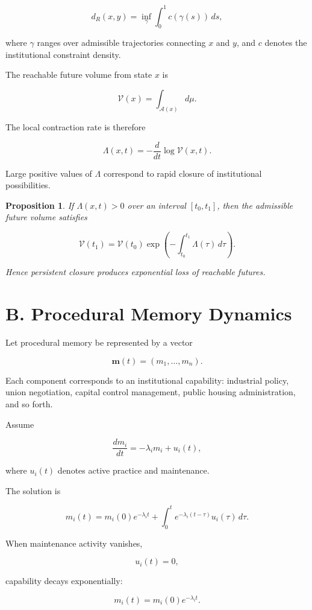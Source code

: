 \documentclass[12pt, a4paper]{article}
\theoremstyle{named}
\newtheorem{proposition}{Proposition}
\begin{document}
\[
d_R(x,y)
=
\inf_{\gamma}
\int_0^1
c(\gamma(s))
\, ds,
\]

where $\gamma$ ranges over admissible trajectories connecting $x$ and
$y$, and $c$ denotes the institutional constraint density.

The reachable future volume from state $x$ is

\[
\mathcal{V}(x)
=
\int_{\mathcal{A}(x)}
d\mu.
\]

The local contraction rate is therefore

\[
\Lambda(x,t)
=
-
\frac{d}{dt}
\log \mathcal{V}(x,t).
\]

Large positive values of $\Lambda$ correspond to rapid closure of
institutional possibilities.

\begin{proposition}
If $\Lambda(x,t) > 0$ over an interval
$[t_0,t_1]$, then the admissible future volume satisfies

\[
\mathcal{V}(t_1)
=
\mathcal{V}(t_0)
\exp
\left(
-\int_{t_0}^{t_1}
\Lambda(\tau)\,d\tau
\right).
\]

Hence persistent closure produces exponential loss of reachable
futures.
\end{proposition}

\section{B. Procedural Memory Dynamics}

Let procedural memory be represented by a vector

\[
\mathbf{m}(t)
=
(m_1,\ldots,m_n).
\]

Each component corresponds to an institutional capability:
industrial policy, union negotiation, capital control management,
public housing administration, and so forth.

Assume

\[
\frac{dm_i}{dt}
=
-\lambda_i m_i
+
u_i(t),
\]

where $u_i(t)$ denotes active practice and maintenance.

The solution is

\[
m_i(t)
=
m_i(0)e^{-\lambda_i t}
+
\int_0^t
e^{-\lambda_i(t-\tau)}
u_i(\tau)
\, d\tau.
\]

When maintenance activity vanishes,

\[
u_i(t)=0,
\]

capability decays exponentially:

\[
m_i(t)
=
m_i(0)e^{-\lambda_i t}.
\]
\end{document}
